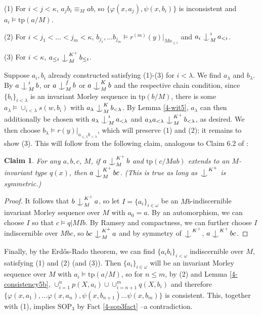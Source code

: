 \documentclass[12pt]{amsart}
\newtheorem{claim}[theorem]{Claim}
\theoremstyle{definition}
\def\Ind#1#2{#1\setbox0=\hbox{$#1x$}\kern\wd0\hbox to 0pt{\hss$#1\mid$\hss}
\lower.9\ht0\hbox to 0pt{\hss$#1\smile$\hss}\kern\wd0}
\def\ind{\mathop{\mathpalette\Ind{}}}
\begin{document}
(1) For $i < j < \kappa$, $a_{j} b_{i} \equiv_{M} ab$, so $\{\varphi(x, a_{j}), \psi(x, b_{i})\}$ is inconsistent and $a_{i} \models \mathrm{tp}(a/M)$.

(2) For $i < j_{1} < \ldots < j_{m} <\kappa $, $b_{j_{1}}, \ldots b_{j_{m}} \models r^{(m)}(y)|_{Ma_{\leq i}}$ and $a_{i} \ind_{M}^{i} a_{<i}$.

(3) For $i < \kappa$, $a_{\leq i} \ind_{M}^{K^{+}} b_{\leq i}$.


Suppose $a_{i}, b_{i}$ already constructed satisfying (1)-(3) for $i < \lambda$. We find $a_{\lambda}$ and $b_{\lambda}$. By $a \ind^{i}_{M} b$, or $a \ind^{f}_{M} b$ or $a \ind^{K}_{M} b$ and the respective chain condition, since $\{b_{i}\}_{i < \lambda}$ is an invariant Morley sequence in $\mathrm{tp}(b/M)$, there is some $a_{\lambda} \models \cup_{i< \lambda} s(w, b_{i})$ with $a_{\lambda} \ind^{K}_{M} b_{<\lambda}$. By Lemma \ref{4-wit5}, $a_{\lambda}$ can then additionally be chosen with $a_{\lambda} \ind^{i}_{M} a_{< \lambda}$ and $a_{\lambda}a_{< \lambda} \ind^{K^{+}}_{M} b_{< \lambda}$, as desired. We then choose $b_{\lambda} \models r(y)|_{a_{\leq \lambda}b_{<\lambda}}$, which will preserve (1) and (2); it remains to show (3). This will follow from the following claim, analogous to Claim 6.2 of \cite{NSOP2}:

\begin{claim}\label{4-inv5}
For any $a, b, c$, $M$, if $a \ind^{K^{+}}_{M} b$ and $\mathrm{tp}(c/Mab)$ extends to an $M$-invariant type $q(x)$, then $a \ind^{K^{+}}_{M} bc$. (This is true as long as $\ind^{K^{+}}$ is symmetric.)
\end{claim}

\begin{proof}
It follows that $b \ind^{K^{+}}_{M} a$, so let $I=\{a_{i}\}_{i \in \omega}$ be an $Mb$-indiscernible invariant Morley sequence over $M$ with $a_{0} = a$. By an automorphism, we can choose $I$ so that $c \models q|MIb$. By Ramsey and compactness, we can further choose $I$ indiscernible over $Mbc$, so $bc \ind^{K^{+}}_{M} a$ and by symmetry of $\ind^{K^{+}}$, $a \ind^{K^{+}} bc$. 
\end{proof}

Finally, by the Erdős-Rado theorem, we can find $\{a_{i}b_{i}\}_{i < \omega}$ indiscernible over $M$, satisfying (1) and (2) (and (3)). Then $\{a_{i}\}_{i \in \omega}$ will be an invariant Morley sequence over $M$ with $a_{i} \models \mathrm{tp}(a/M)$, so for $n \leq m$, by (2) and Lemma \ref{4-consistency5b}, $\cup_{i=1}^{n}p(X, a_{i}) \cup \cup_{i =n+1}^{m} q(X, b_{i})$ and therefore $\{\varphi(x, a_{1}), \ldots \varphi(x, a_{n}), \psi(x, b_{n+1}) \ldots \psi(x, b_{m})\}$ is consistent. This, together with (1), implies $\mathrm{SOP}_{3}$ by Fact \ref{4-sop3fact} --a contradiction. 
\end{document}
